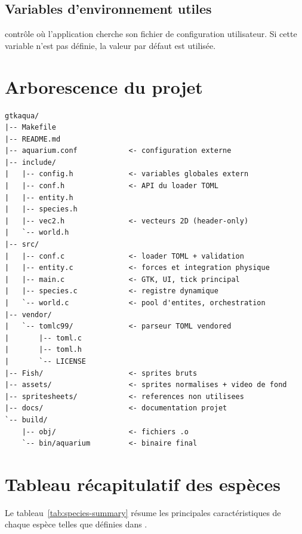 \section{Variables d'environnement utiles}

 contrôle où l'application cherche son
fichier de configuration utilisateur. Si cette variable n'est
pas définie, la valeur par défaut
 est utilisée.

\chapter{Arborescence du projet}
\label{ann:layout}

\begin{verbatim}
gtkaqua/
|-- Makefile
|-- README.md
|-- aquarium.conf            <- configuration externe
|-- include/
|   |-- config.h             <- variables globales extern
|   |-- conf.h               <- API du loader TOML
|   |-- entity.h
|   |-- species.h
|   |-- vec2.h               <- vecteurs 2D (header-only)
|   `-- world.h
|-- src/
|   |-- conf.c               <- loader TOML + validation
|   |-- entity.c             <- forces et integration physique
|   |-- main.c               <- GTK, UI, tick principal
|   |-- species.c            <- registre dynamique
|   `-- world.c              <- pool d'entites, orchestration
|-- vendor/
|   `-- tomlc99/             <- parseur TOML vendored
|       |-- toml.c
|       |-- toml.h
|       `-- LICENSE
|-- Fish/                    <- sprites bruts
|-- assets/                  <- sprites normalises + video de fond
|-- spritesheets/            <- references non utilisees
|-- docs/                    <- documentation projet
`-- build/
    |-- obj/                 <- fichiers .o
    `-- bin/aquarium         <- binaire final
\end{verbatim}

\chapter{Tableau récapitulatif des espèces}
\label{ann:species-table}

Le tableau~\ref{tab:species-summary} résume les principales
caractéristiques de chaque espèce telles que définies dans
.

